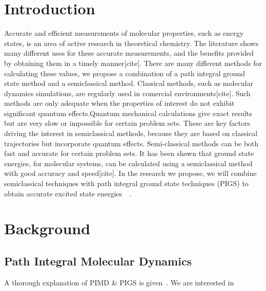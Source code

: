 \documentclass[12pt,letterpaper, oneside, draft]{article}              %
\numberwithin{equation}{section} %
\begin{document}
\section{Introduction}
Accurate and efficient measurements of molecular properties, such as energy states, is an area of active research in theoretical chemistry. The literature shows many different uses for these accurate measurements, and the benefits provided by obtaining them in a timely manner[cite]. There are many different methods for calculating these values, we propose a combination of a path integral ground state method and a semiclassical method. Classical methods, such as molecular dynamics simulations, are regularly used in comercial environments[cite]. Such methods are only adequate when the properties of interest do not exhibit significant quantum effects.Quantum mechanical calculations give exact results but are very slow or impossible for certain problem sets. These are key factors driving the interest in semiclassical methods, because they are based on classical trajectories but incorporate quantum effects. Semi-classical methods can be both fast and accurate for certain problem sets. It has been shown that ground state energies, for molecular systems, can be calculated using a semiclassical method with good accuracy and speed[cite]. In the research we propose, we will combine semiclassical techniques with path integral ground state techniques (PIGS) to obtain accurate excited state energies~\cite{issack2007semiclassical}~\cite{schmidt2014inclusion}.

\section{Background}

\subsection*{Path Integral Molecular Dynamics}
A thorough explanation of PIMD $\&$ PIGS is given~\cite{iouchtchenko2014particle}. We are interested in 
\end{document}
